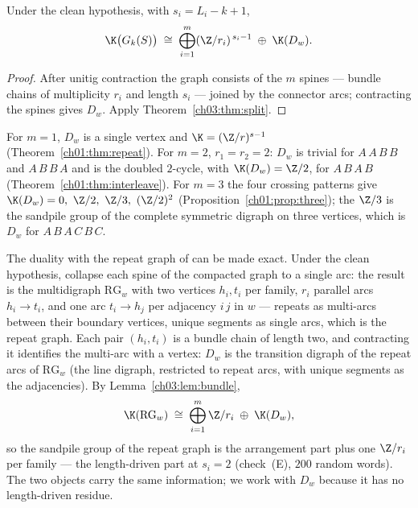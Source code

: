 \begin{corollary}\label{ch03:cor:clean}
Under the clean hypothesis, with $s_i=L_i-k+1$,
\[
\K\bigl(G_k(S)\bigr)\;\cong\;\bigoplus_{i=1}^{m}(\Z/r_i)^{\,s_i-1}\;\oplus\;\K(D_w).
\]
\end{corollary}

\begin{proof}
After unitig contraction the graph consists of the $m$ spines --- bundle chains of
multiplicity $r_i$ and length $s_i$ --- joined by the connector arcs; contracting the
spines gives $D_w$. Apply Theorem~\ref{ch03:thm:split}.
\end{proof}

\begin{corollary}\label{ch03:cor:cases}
For $m=1$, $D_w$ is a single vertex and $\K=(\Z/r)^{s-1}$ (Theorem~\ref{ch01:thm:repeat}). For $m=2$,
$r_1=r_2=2$: $D_w$ is trivial for $A\,A\,B\,B$ and $A\,B\,B\,A$ and is the doubled
$2$-cycle, with $\K(D_w)=\Z/2$, for $A\,B\,A\,B$ (Theorem~\ref{ch01:thm:interleave}). For $m=3$ the four
crossing patterns give $\K(D_w)=0,\ \Z/2,\ \Z/3,\ (\Z/2)^{2}$ (Proposition~\ref{ch01:prop:three}); the
$\Z/3$ is the sandpile group of the complete symmetric digraph on three vertices, which is
$D_w$ for $A\,B\,A\,C\,B\,C$.
\end{corollary}

\begin{remark}\label{ch03:rem:rg}
The duality with the repeat graph of \cite{PTT,Flye} can be made exact. Under the clean
hypothesis, collapse each spine of the compacted graph to a single arc: the result is the
multidigraph $\mathrm{RG}_w$ with two vertices $h_i,t_i$ per family, $r_i$ parallel arcs
$h_i\to t_i$, and one arc $t_i\to h_j$ per adjacency $i\,j$ in $w$ --- repeats as
multi-arcs between their boundary vertices, unique segments as single arcs, which is the
repeat graph. Each pair $(h_i,t_i)$ is a bundle chain of length two, and contracting it
identifies the multi-arc with a vertex: $D_w$ is the transition digraph of the repeat
arcs of $\mathrm{RG}_w$ (the line digraph, restricted to repeat arcs, with unique
segments as the adjacencies). By Lemma~\ref{ch03:lem:bundle},
\[
\K(\mathrm{RG}_w)\;\cong\;\bigoplus_{i=1}^{m}\Z/r_i\;\oplus\;\K(D_w),
\]
so the sandpile group of the repeat graph is the arrangement part plus one $\Z/r_i$ per
family --- the length-driven part at $s_i=2$ (check~(E), $200$ random words). The two
objects carry the same information; we work with $D_w$ because it has no length-driven
residue.
\end{remark}

